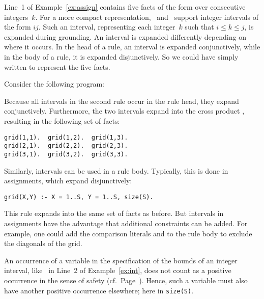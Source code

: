 Line~1 of Example~\ref{ex:assign} contains
five facts of the form 
over consecutive integers~$k$.
For a more compact representation,
\gringo\ and \clingo\ support integer intervals of the form $i$$j$.
Such an interval, representing each integer~$k$ such that $i\leq k\leq j$,
is expanded during grounding.
An interval is expanded differently depending on where it occurs.
In the head of a rule, an interval is expanded conjunctively,
while in the body of a rule, it is expanded disjunctively.
So we could have simply written  to represent the five facts.

\begin{example}\label{ex:int}
Consider the following program:

Because all intervals in the second rule occur in the rule head,
they expand conjunctively.
Furthermore, the two intervals expand into the cross product ,
resulting in the following set of facts:
\begin{lstlisting}[numbers=none]
grid(1,1).  grid(1,2).  grid(1,3).
grid(2,1).  grid(2,2).  grid(2,3).
grid(3,1).  grid(3,2).  grid(3,3).
\end{lstlisting}
Similarly, intervals can be used in a rule body.
Typically, this is done in assignments, which expand disjunctively:
\begin{lstlisting}[firstnumber=2]
grid(X,Y) :- X = 1..S, Y = 1..S, size(S).
\end{lstlisting}
This rule expands into the same set of facts as before.
But intervals in assignments have the advantage that additional constraints can be added.
For example, one could add the comparison literals  and 
to the rule body to exclude the diagonals of the grid.
\end{example}

\begin{note}
An occurrence of a variable in the specification of the bounds
of an integer interval, like~ in Line~2 of Example~\ref{ex:int},
does not count as a positive occurrence
in the sense of safety (cf.\ Page~\pageref{pg:safe}).
Hence, such a variable must also have another positive occurrence elsewhere;
here in \lstinline{size(S)}.
%
\end{note}

